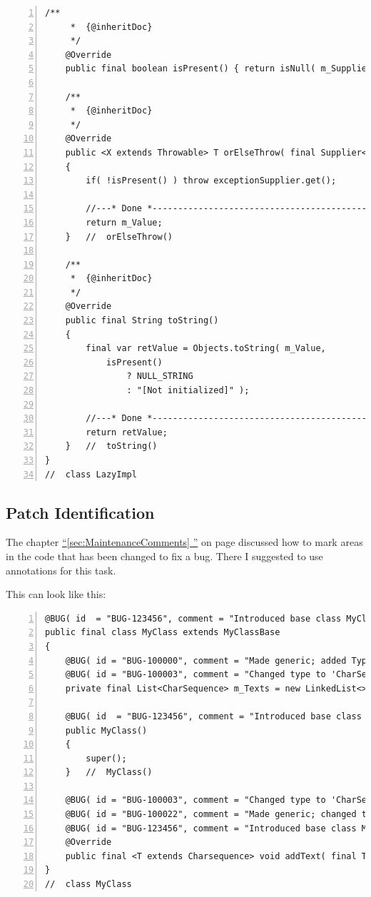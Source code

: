 \documentclass[11pt,a4paper, titlepage, parskip=half, headsepline, footsepline, cleardoublepage=current, headheight=1cm]{scrbook}
\newcommand*{\tqfullvref}[1]{\hyperref[{#1}]{“\ref*{#1} \nameref*{#1}”} on page \pageref{#1}}
\begin{document}
\begin{lstlisting}[numbers=left,caption={LazyImpl.java}]
    /**
     *  {@inheritDoc}
     */
    @Override
    public final boolean isPresent() { return isNull( m_Supplier ); }

    /**
     *  {@inheritDoc}
     */
    @Override
    public <X extends Throwable> T orElseThrow( final Supplier<? extends X> exceptionSupplier ) throws X
    {
        if( !isPresent() ) throw exceptionSupplier.get();

        //---* Done *------------------------------------------------
        return m_Value;
    }   //  orElseThrow()

    /**
     *  {@inheritDoc}
     */
    @Override
    public final String toString()
    {
        final var retValue = Objects.toString( m_Value, 
            isPresent() 
                ? NULL_STRING 
                : "[Not initialized]" );

        //---* Done *------------------------------------------------
        return retValue;
    }   //  toString()
}
//  class LazyImpl
\end{lstlisting}

\subsection{Patch Identification}\label{sec:PatchIdentification}
The chapter \tqfullvref{sec:MaintenanceComments} discussed how to mark areas in the code that has been changed to fix a bug. There I suggested to use annotations for this task.

This can look like this:
\begin{lstlisting}[numbers=left]
@BUG( id  = "BUG-123456", comment = "Introduced base class MyClassBase" )
public final class MyClass extends MyClassBase
{
    @BUG( id = "BUG-100000", comment = "Made generic; added Typ 'String'" )
    @BUG( id = "BUG-100003", comment = "Changed type to 'CharSequence'" )
    private final List<CharSequence> m_Texts = new LinkedList<>();

    @BUG( id  = "BUG-123456", comment = "Introduced base class MyClassBase; calling super()" )
    public MyClass()
    {
        super();
    }   //  MyClass()
    
    @BUG( id = "BUG-100003", comment = "Changed type to 'CharSequence'" )
    @BUG( id = "BUG-100022", comment = "Made generic; changed to 'extends CharSequence'" )
    @BUG( id = "BUG-123456", comment = "Introduced base class MyClassBase; added @Override" )
    @Override
    public final <T extends Charsequence> void addText( final T text ) { … }
}
//  class MyClass
\end{lstlisting}
\end{document}

